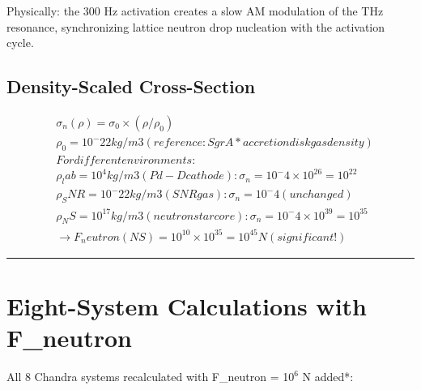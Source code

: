 \documentclass[12pt,a4paper]{article}
\begin{document}
Physically: the 300 Hz activation creates a slow AM modulation of the THz resonance, synchronizing lattice neutron drop nucleation with the activation cycle.

\subsection{Density-Scaled Cross-Section}

\begin{equation}
\begin{aligned}
  & \sigma_n(\rho) = \sigma_0 \times (\rho / \rho_0) \\
  & \rho_0    = 10^-22 kg/m3  (reference: Sgr A* accretion disk gas density) \\
  & For different environments: \\
  & \rho_lab  = 10^4 kg/m3    (Pd-D cathode):      \sigma_n = 10^-4 \times 10^26 = 10^22 \\
  & \rho_SNR  = 10^-22 kg/m3  (SNR gas):           \sigma_n = 10^-4 (unchanged) \\
  & \rho_NS   = 10^17 kg/m3   (neutron star core):  \sigma_n = 10^-4 \times 10^39 = 10^35 \\
  & \to F_neutron(NS) = 10^10 \times 10^35 = 10^45 N  (significant!)
\end{aligned}
\end{equation}

\medskip\hrule\medskip

\section{Eight-System Calculations with F\_neutron}

All 8 Chandra systems recalculated with F\_neutron = 1$0^{6}$ N added*:
\end{document}
